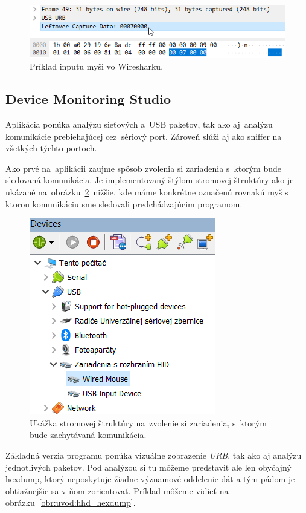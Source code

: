 \begin{figure}[!htb]
	\centering
	\includegraphics[width=12cm]{img/uvod_wireshark_input}
	\caption{Príklad inputu myši vo Wiresharku.}
	\label{obr:uvod:wireshark_input}
\end{figure}

\subsection*{Device Monitoring Studio}

Aplikácia ponúka analýzu sieťových a~USB paketov, tak ako aj~analýzu komunikácie prebiehajúcej cez~sériový port. Zároveň slúži aj ako sniffer na všetkých týchto portoch.

Ako prvé na~aplikácii zaujme spôsob zvolenia si zariadenia s~ktorým bude sledovaná komunikácia. Je implementovaný štýlom stromovej štruktúry ako je ukázané na~obrázku~\ref{obr:uvod:hhd_treeview_foto}~nižšie, kde máme konkrétne označenú rovnakú myš s ktorou komunikáciu sme sledovali predchádzajúcim programom. 

\begin{figure}[!htb]
	\centering
	\includegraphics{img/uvod_hhd_treeview}
	\caption{Ukážka stromovej štruktúry na~zvolenie si zariadenia, s~ktorým bude zachytávaná komunikácia.}
	\label{obr:uvod:hhd_treeview_foto}
\end{figure}

Základná verzia programu ponúka vizuálne zobrazenie \textit{URB}, tak ako aj analýzu jednotlivých paketov.
Pod analýzou si tu môžeme predstaviť ale len obyčajný hexdump, ktorý neposkytuje žiadne významové oddelenie dát a tým pádom je obtiažnejšie sa v ňom zorientovať. Príklad môžeme vidieť na obrázku~\ref{obr:uvod:hhd_hexdump}.

